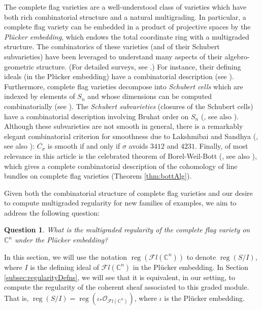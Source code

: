\documentclass[12pt,reqno]{amsart}
\newtheorem{question}[theorem]{Question}
\theoremstyle{definition}
\theoremstyle{remark}
\newcommand{\reg}{\operatorname{reg}}
\newcommand{\calF}{{\mathcal{F}}}
\newcommand{\calO}{{\mathcal{O}}}
\begin{document}
The complete flag varieties are a well-understood class of varieties which have both rich combinatorial structure and a natural multigrading.  In particular, a complete flag variety can be embedded in a product of projective spaces by the \textit{Pl\"ucker embedding}, which endows the total coordinate ring with a multigraded structure.
The combinatorics of these varieties (and of their Schubert subvarieties) have been leveraged to understand many aspects of their algebro-geometric structure.  (For detailed surveys, see \cite{BilleyGaoPawlowski2025, Brion2005}.)  For instance, their defining ideals (in the Pl\"ucker embedding) have a combinatorial description (see \cite[\S 8.1-9.1]{Fulton1997}).  Furthermore, complete flag varieties decompose into \textit{Schubert cells} which are indexed by elements of $S_n$ and whose dimensions can be computed combinatorially (see \cite[\S 3.3]{BilleyGaoPawlowski2025}).  The \textit{Schubert subvarieties} (closures of the Schubert cells) have a combinatorial description involving Bruhat order on $S_n$ (\cite{Ehresmann1934}, see also \cite[\S 3.4]{BilleyGaoPawlowski2025}).  Although these subvarieties are not smooth in general, there is a remarkably elegant combinatorial criterion for smoothness due to Lakshmibai and Sandhya (\cite{LakshmibaiSadhya1990}, see also \cite{AbeBilley2016}): $\overline{C_{\sigma}}$ is smooth if and only if $\sigma$ avoids $3412$ and $4231$.  Finally, of most relevance in this article is the celebrated theorem of Borel-Weil-Bott (\cite{SerreBorelWeil1995,Bott1957}, see also \cite[\S 4.1]{Weyman2003}), which gives a complete combinatorial description of the cohomology of line bundles on complete flag varieties (Theorem \ref{thm:bottAlg}).

Given both the combinatorial structure of complete flag varieties and our desire to compute multigraded regularity for new families of examples, we aim to address the following question:

\begin{question}\label{q:intro}
    What is the multigraded regularity of the complete flag variety on $\mathbb C^n$ under the Pl\"ucker embedding?
\end{question}

In this section, we will use the notation $\reg(\calF l(\mathbb C^n))$ to denote $\reg(S/I)$, where $I$ is the defining ideal of $\calF l(\mathbb C^n)$ in the Pl\"ucker embedding.  In Section \ref{subsec:regularityDefns}, we will see that it is equivalent, in our setting, to compute the regularity of the coherent sheaf associated to this graded module.  That is, $\reg(S/I) = \reg(\iota_*\calO_{\calF l(\mathbb C^n)})$, where $\iota$ is the Pl\"ucker embedding.
\end{document}

